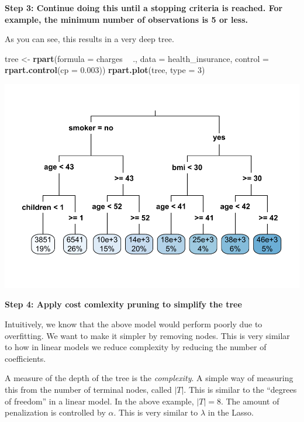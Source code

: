 \documentclass[openany]{book}
\newenvironment{Shaded}{\begin{snugshade}}{\end{snugshade}}
\newcommand{\DataTypeTok}[1]{\textcolor[rgb]{0.13,0.29,0.53}{#1}}
\newcommand{\DecValTok}[1]{\textcolor[rgb]{0.00,0.00,0.81}{#1}}
\newcommand{\FloatTok}[1]{\textcolor[rgb]{0.00,0.00,0.81}{#1}}
\newcommand{\KeywordTok}[1]{\textcolor[rgb]{0.13,0.29,0.53}{\textbf{#1}}}
\newcommand{\NormalTok}[1]{#1}
\newcommand{\OperatorTok}[1]{\textcolor[rgb]{0.81,0.36,0.00}{\textbf{#1}}}
\newcommand{\StringTok}[1]{\textcolor[rgb]{0.31,0.60,0.02}{#1}}
\begin{document}
\textbf{Step 3: Continue doing this until a stopping criteria is reached. For example, the minimum number of observations is 5 or less.}

As you can see, this results in a very deep tree.

\begin{Shaded}
\begin{Highlighting}[]
\NormalTok{tree <-}\StringTok{ }\KeywordTok{rpart}\NormalTok{(}\DataTypeTok{formula =}\NormalTok{ charges }\OperatorTok{~}\StringTok{  }\NormalTok{., }\DataTypeTok{data =}\NormalTok{ health_insurance,}
              \DataTypeTok{control =} \KeywordTok{rpart.control}\NormalTok{(}\DataTypeTok{cp =} \FloatTok{0.003}\NormalTok{))}
\KeywordTok{rpart.plot}\NormalTok{(tree, }\DataTypeTok{type =} \DecValTok{3}\NormalTok{)}
\end{Highlighting}
\end{Shaded}

\includegraphics{06-tree-based-models_files/figure-latex/unnamed-chunk-4-1.pdf}

\textbf{Step 4: Apply cost comlexity pruning to simplify the tree}

Intuitively, we know that the above model would perform poorly due to overfitting. We want to make it simpler by removing nodes. This is very similar to how in linear models we reduce complexity by reducing the number of coefficients.

A measure of the depth of the tree is the \emph{complexity}. A simple way of measuring this from the number of terminal nodes, called \(|T|\). This is similar to the ``degrees of freedom'' in a linear model. In the above example, \(|T| = 8\). The amount of penalization is controlled by \(\alpha\). This is very similar to \(\lambda\) in the Lasso.
\end{document}
